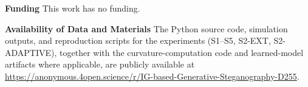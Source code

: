 \documentclass[a4paper,fleqn]{cas-dc}
\begin{document}

\noindent
\begin{sloppypar}
\textbf{Funding} This work has no funding.
\end{sloppypar}

\noindent
\begin{sloppypar}
\textbf{Availability of Data and Materials} The Python source code,
simulation outputs, and reproduction scripts for the experiments
(S1--S5, S2-EXT, S2-ADAPTIVE), together with the curvature-computation
code and learned-model artifacts where applicable, are publicly available at
\url{https://anonymous.4open.science/r/IG-based-Generative-Steganography-D255}.
\end{sloppypar}


%
\end{document}
